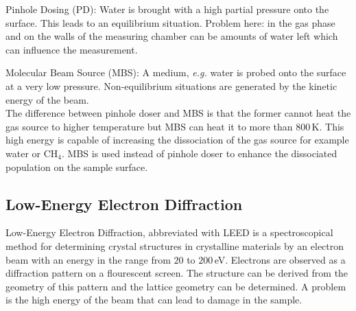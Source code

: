 \documentclass[11pt,DIV=13,BCOR=5mm,a4paper,headinclude]{scrbook}
\newcommand\todo[1]{\textcolor{red}{TODO: \textit{{#1}}}}
\begin{document}
Pinhole Dosing (PD): Water is brought with a high partial pressure onto the surface.
This leads to an equilibrium situation.
Problem here: in the gas phase and on the walls of the measuring chamber can be amounts of water left which can influence the measurement.


Molecular Beam Source (MBS): A medium, \textit{e.g.} water is probed onto the surface at a very low pressure.
Non-equilibrium situations are generated by the kinetic energy of the beam.
\\
The difference between pinhole doser and MBS is that the former cannot heat the gas source to higher temperature but MBS can heat it to more than $800\,$K.
This high energy is capable of increasing the dissociation of the gas source for example water or CH$_4$.
MBS is used instead of pinhole doser to enhance the dissociated population on the sample surface.

\subsection{Low-Energy Electron Diffraction}
Low-Energy Electron Diffraction, abbreviated with LEED is a spectroscopical method for determining crystal structures in crystalline materials by an electron beam with an energy in the range from $20$ to $200\,$eV.
Electrons are observed as a diffraction pattern on a flourescent screen.
The structure can be derived from the geometry of this pattern and the lattice geometry can be determined.
A problem is the high energy of the beam that can lead to damage in the sample.
\def\thefigure{B.\arabic{figure}}
\def\thetable{B.\arabic{table}}
\end{document}
